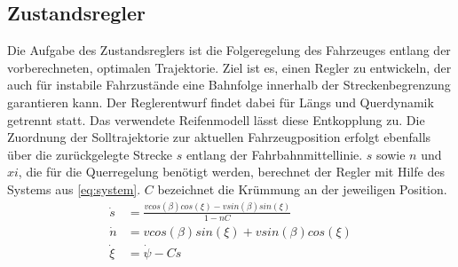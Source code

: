 \documentclass[pdf]{ifacconf}
\begin{document}
\subsection{Zustandsregler}
Die Aufgabe des Zustandsreglers ist die Folgeregelung des Fahrzeuges entlang der vorberechneten, optimalen Trajektorie. Ziel ist es, einen Regler zu entwickeln, der auch für instabile Fahrzustände eine Bahnfolge innerhalb der Streckenbegrenzung garantieren kann. Der Reglerentwurf findet dabei für Längs und Querdynamik getrennt statt. Das verwendete Reifenmodell lässt diese Entkopplung zu. Die Zuordnung der Solltrajektorie zur aktuellen Fahrzeugposition erfolgt ebenfalls über die zurückgelegte Strecke $s$ entlang der Fahrbahnmittellinie. $s$ sowie $n$ und $xi$, die für die Querregelung benötigt werden, berechnet der Regler mit Hilfe des Systems aus \ref{eq:system}. $C$ bezeichnet die Krümmung an der jeweiligen Position.
\begin{align}
	\dot{s} &= \frac{v cos(\beta) cos(\xi) - v sin(\beta) sin(\xi)}{1- n C} \\
	\dot{n} &= v cos(\beta) sin(\xi) + v sin(\beta) cos(\xi) \\
	\dot{\xi} &= \dot{\psi} - C \dot{s}
	\label{eq:system}
\end{align}
\end{document}
